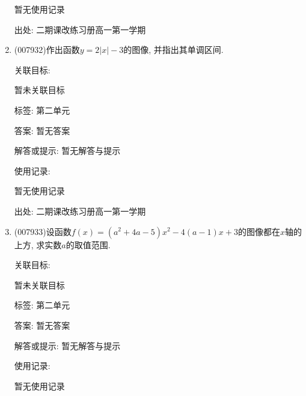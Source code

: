 \documentclass[10pt,a4paper]{article}
\begin{document}
\begin{enumerate}[1.]
暂无使用记录


出处: 二期课改练习册高一第一学期
\item { (007932)}作出函数$y=2|x|-3$的图像, 并指出其单调区间.


关联目标:

暂未关联目标



标签: 第二单元

答案: 暂无答案

解答或提示: 暂无解答与提示

使用记录:

暂无使用记录


出处: 二期课改练习册高一第一学期
\item { (007933)}设函数$f(x)=(a^2+4a-5)x^2-4(a-1)x+3$的图像都在$x$轴的上方, 求实数$a$的取值范围.


关联目标:

暂未关联目标



标签: 第二单元

答案: 暂无答案

解答或提示: 暂无解答与提示

使用记录:

暂无使用记录



\end{enumerate}
\end{document}
